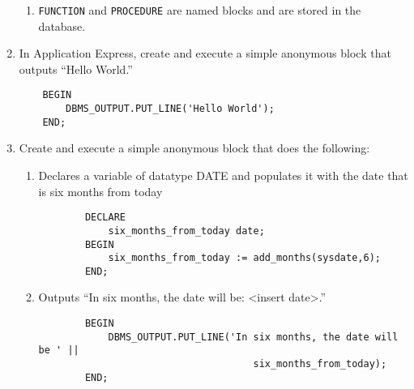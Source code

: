 \documentclass[11pt]{article}
\begin{document}
\begin{enumerate}
\begin{enumerate}
\item \texttt{FUNCTION} and \texttt{PROCEDURE} are named blocks and are stored in the database.
\end{enumerate}

\item In Application Express, create and execute a simple anonymous block that
outputs “Hello World.”
\begin{verbatim}
    BEGIN
        DBMS_OUTPUT.PUT_LINE('Hello World');
    END;
\end{verbatim}

\item Create and execute a simple anonymous block that does the following:
\begin{enumerate}
\item Declares a variable of datatype DATE and populates it with the date
that is six months from today

\begin{verbatim}
        DECLARE
            six_months_from_today date;
        BEGIN
            six_months_from_today := add_months(sysdate,6);
        END;
\end{verbatim}

\item Outputs “In six months, the date will be: <insert date>.”
\begin{verbatim}
        BEGIN
            DBMS_OUTPUT.PUT_LINE('In six months, the date will be ' ||
                                     six_months_from_today);
        END;
\end{verbatim}
\end{enumerate}
\end{enumerate}
\end{document}
